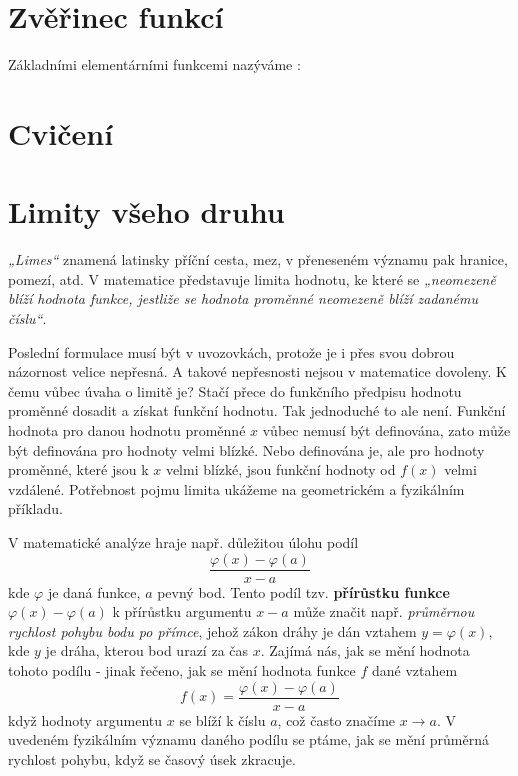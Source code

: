   \section{Zvěřinec funkcí}\label{mai:IchapIIIsecII}
    Základními elementárními funkcemi nazýváme \cite[s.~10]{PolakMA1}:
     
  \section{Cvičení}\label{mai:IchapIIIsecIII}
  
  \section{Limity všeho druhu}\label{mai:IchapIIIsecIV}  
    \emph{„Limes“} znamená latinsky příční cesta, mez, v přeneseném významu pak hranice, pomezí,
    atd. V matematice představuje limita hodnotu, ke které se \emph{„neomezeně blíží hodnota funkce,
    jestliže se hodnota proměnné neomezeně blíží zadanému číslu“}. 
    
    Poslední formulace musí být v uvozovkách, protože je i přes svou dobrou názornost velice
    nepřesná. A takové nepřesnosti nejsou v matematice dovoleny. K čemu vůbec úvaha o limitě je?
    Stačí přece do funkčního předpisu hodnotu proměnné dosadit a získat funkční hodnotu. Tak
    jednoduché to ale není. Funkční hodnota pro danou hodnotu proměnné \(x\) vůbec nemusí být
    definována, zato může být definována pro hodnoty velmi blízké. Nebo definována je, ale pro
    hodnoty proměnné, které jsou k \(x\) velmi blízké, jsou funkční hodnoty od \(f(x)\) velmi
    vzdálené. Potřebnost pojmu limita ukážeme na geometrickém a fyzikálním příkladu.
    
    V matematické analýze hraje např. důležitou úlohu podíl \cite[s.~117]{Brabec1989}
    \begin{equation*}
      \dfrac{\varphi(x) - \varphi(a)}{x - a}
    \end{equation*}
    kde \(\varphi\) je daná funkce, \(a\) pevný bod. Tento podíl tzv. \textbf{přírůstku funkce} 
    \(\varphi(x) - \varphi(a)\) k přírůstku argumentu \(x - a\) může značit např. \emph{průměrnou 
    rychlost pohybu bodu po přímce}, jehož zákon dráhy je dán vztahem \(y = \varphi(x)\), kde \(y\) 
    je dráha, kterou bod urazí za čas \(x\). Zajímá nás, jak se mění hodnota tohoto podílu - jinak 
    řečeno, jak se mění hodnota funkce \(f\) dané vztahem
    \begin{equation}\label{mai:eq037}
      f(x) = \dfrac{\varphi(x) - \varphi(a)}{x - a}
    \end{equation}
    když hodnoty argumentu \(x\) se blíží k číslu \(a\), což často značíme \(x\rightarrow a\). V 
    uvedeném fyzikálním významu daného podílu se ptáme, jak se mění průměrná rychlost pohybu, když 
    se časový úsek zkracuje. 
    
